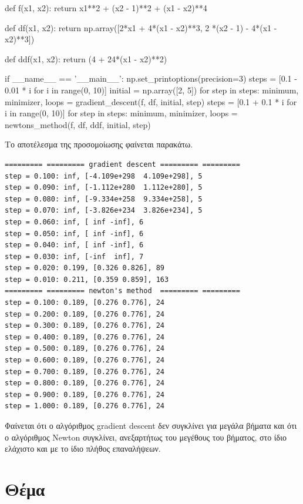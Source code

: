 \documentclass{article}
\newcommand{\eng}[1]{\foreignlanguage{english}{#1}} %
\begin{document}
\begin{python}
def f(x1, x2):
    return x1**2 + (x2 - 1)**2 + (x1 - x2)**4

def df(x1, x2):
    return np.array([2*x1 + 4*(x1 - x2)**3, 2 *(x2 - 1) - 4*(x1 - x2)**3])

def ddf(x1, x2):
    return (4 + 24*(x1 - x2)**2)

if __name__ == '__main__':
    np.set_printoptions(precision=3)
    steps = [0.1 - 0.01 * i for i in range(0, 10)]
    initial = np.array([2, 5])
    for step in steps:
        minimum, minimizer, loops = gradient_descent(f, df, initial, step)
    steps = [0.1 + 0.1 * i for i in range(0, 10)]
    for step in steps:
        minimum, minimizer, loops = newtons_method(f, df, ddf, initial, step)
\end{python}

Το αποτέλεσμα της προσομοίωσης φαίνεται παρακάτω.

\begin{verbatim}
========= ========= gradient descent ========= =========
step = 0.100: inf, [-4.109e+298  4.109e+298], 5
step = 0.090: inf, [-1.112e+280  1.112e+280], 5
step = 0.080: inf, [-9.334e+258  9.334e+258], 5
step = 0.070: inf, [-3.826e+234  3.826e+234], 5
step = 0.060: inf, [ inf -inf], 6
step = 0.050: inf, [ inf -inf], 6
step = 0.040: inf, [ inf -inf], 6
step = 0.030: inf, [-inf  inf], 7
step = 0.020: 0.199, [0.326 0.826], 89
step = 0.010: 0.211, [0.359 0.859], 163
========= ========= newton's method  ========= =========
step = 0.100: 0.189, [0.276 0.776], 24
step = 0.200: 0.189, [0.276 0.776], 24
step = 0.300: 0.189, [0.276 0.776], 24
step = 0.400: 0.189, [0.276 0.776], 24
step = 0.500: 0.189, [0.276 0.776], 24
step = 0.600: 0.189, [0.276 0.776], 24
step = 0.700: 0.189, [0.276 0.776], 24
step = 0.800: 0.189, [0.276 0.776], 24
step = 0.900: 0.189, [0.276 0.776], 24
step = 1.000: 0.189, [0.276 0.776], 24
\end{verbatim}

Φαίνεται ότι ο αλγόριθμος \eng{gradient descent} δεν συγκλίνει για μεγάλα βήματα
και ότι ο αλγόριθμος \eng{Newton} συγκλίνει, ανεξαρτήτως του μεγέθους του βήματος,
στο ίδιο ελάχιστο και με το ίδιο πλήθος επαναλήψεων.

\clearpage
\section{Θέμα}
\end{document}
